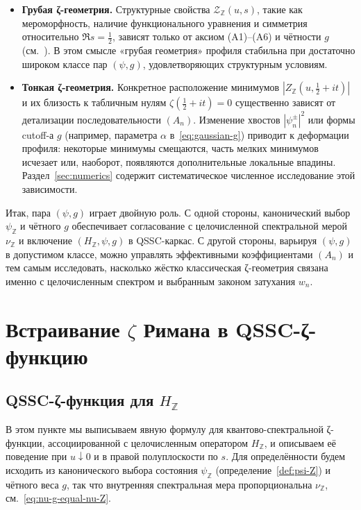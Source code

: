 \documentclass{article}
\numberwithin{equation}{section}
\theoremstyle{plain}
\theoremstyle{definition}
\theoremstyle{remark}
\def\alpha{α}\def\beta{β}\def\gamma{γ}\def\Gamma{Γ}%
\begin{document}
\begin{itemize}
  \item \textbf{Грубая ζ-геометрия.}  
  Структурные свойства \(\mathcal Z_{\mathbb Z}(u,s)\), такие как
  мероморфность, наличие функционального уравнения и симметрия относительно
  \(\Re s=\tfrac12\), зависят только от аксиом \textup{(A1)}–\textup{(A6)}
  и чётности \(g\) (см.~\cite{Monakhov-QSG-002}). В этом смысле
  «грубая геометрия» профиля стабильна при достаточно широком классе
  пар \((\psi,g)\), удовлетворяющих структурным условиям.

  \item \textbf{Тонкая ζ-геометрия.}  
  Конкретное расположение минимумов \(|Z_{\mathbb Z}(u,\tfrac12+it)|\)
  и их близость к табличным нулям \(\zeta(\tfrac12+it)=0\) существенно
  зависят от детализации последовательности \((A_n)\). Изменение хвостов
  \(|\psi_n^\pm|^2\) или формы cutoff-а \(g\) (например, параметра \(\alpha\)
  в~\eqref{eq:gaussian-g}) приводит к деформации профиля:
  некоторые минимумы смещаются, часть мелких минимумов исчезает или,
  наоборот, появляются дополнительные локальные впадины. Раздел~\ref{sec:numerics}
  содержит систематическое численное исследование этой зависимости.
\end{itemize}

\noindent
Итак, пара \((\psi,g)\) играет двойную роль. С одной стороны, канонический
выбор \(\psi_{\mathbb Z}\) и чётного \(g\) обеспечивает согласование с
целочисленной спектральной мерой \(\nu_{\mathbb Z}\) и включение
\((H_{\mathbb Z},\psi,g)\) в QSSC-каркас. С другой стороны, варьируя
\((\psi,g)\) в допустимом классе, можно управлять эффективными
коэффициентами \((A_n)\) и тем самым исследовать, насколько жёстко
классическая ζ-геометрия связана именно с целочисленным спектром
и выбранным законом затухания \(w_n\).
\clearpage

\section{Встраивание $\zeta$ Римана в QSSC-ζ-функцию}
\label{sec:embedding-zeta}

\subsection{QSSC-ζ-функция для \texorpdfstring{$H_{\mathbb Z}$}{H\_Z}}
\label{subsec:qssc-zeta-HZ}

\noindent
В этом пункте мы выписываем явную формулу для квантово-спектральной
ζ-функции, ассоциированной с целочисленным оператором
$H_{\mathbb Z}$, и описываем её поведение при $u\downarrow 0$ и
в правой полуплоскости по $s$. Для определённости будем исходить
из канонического выбора состояния $\psi_{\mathbb Z}$ 
(определение~\ref{def:psi-Z}) и чётного веса $g$, так что внутренняя
спектральная мера пропорциональна $\nu_{\mathbb Z}$,
см.~\eqref{eq:nu-g-equal-nu-Z}.
\end{document}
